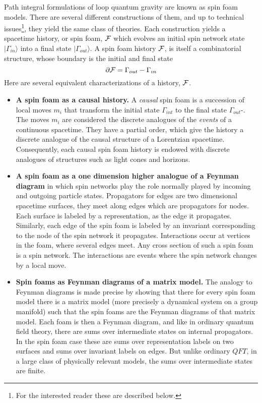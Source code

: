 \documentclass[12pt]{article}
\newcommand{\f}{\begin{equation}}
\newcommand{\ff}{\end{equation}}
\begin{document}
Path integral formulations of loop quantum gravity are known as spin foam models.
There are several different  constructions of them, and up to 
technical issues\footnote{For the interested reader these are described below.},
they yield the same class of theories. Each construction yields a spacetime
history, or spin foam, $\cal F$ which evolves an initial spin network state
$|\Gamma_{in}\rangle $ into   a final state $| \Gamma_{out}\rangle $.  A spin foam
history $\cal F$,  is
itself a combinatorial structure, whose boundary is the initial and final
state
\f
\partial {\cal F} = \Gamma_{out}-\Gamma_{in}
\ff
Here are several equivalent characterizations of a history, $\cal F$.

\begin{itemize}

\item{}{\bf A spin foam as a causal history.}  A {\it causal} spin foam is a succession of
local moves $m_i$ that transform the initial state $\Gamma_{int}$ to
the final state $\Gamma_{out}$\cite{F-foam}-\cite{fmls1}.  The moves $m_i$ are considered the
discrete analogues of the {\it events} of a continuous spacetime. They 
have a partial order,
which give the history a discrete analogue of the causal structure of 
a Lorentzian spacetime.  Consequently, each causal spin foam history
is endowed with discrete analogues of structures such as light cones and horizons.

\item{}{\bf A spin foam as a one dimension higher analogue of a Feynman diagram}
in which spin networks play the role normally played by incoming and 
outgoing particle states\cite{RR-foam}. 
Propagators for edges are two dimensional 
spacetime surfaces, they meet along edges which are propagators for nodes.
Each surface is labeled by a representation, as the edge it propagates. Similarly,
each edge of the spin foam is labeled by an invariant corresponding to the node
of the spin network it propagates. 
Interactions occur at vertices in the foam, where several edges meet.
 Any cross section of such a spin foam is
a spin network.  The interactions are events where the spin network changes by
a local move.  

\item{}{\bf Spin foams as Feynman diagrams of a matrix model.}  The analogy
to Feynman diagrams is made precise by showing that there for every spin foam model
there is a matrix model (more precisely a dynamical system on a group manifold) 
such that the spin foams are the Feynman diagrams of
that matrix model\cite{foam-matrix}.  Each foam is then a Feynman diagram, and like in ordinary
quantum field theory, there are sums over intermediate states on internal
propagators. In the spin foam case these are sums over representation labels
on two surfaces and sums over invariant labels on edges.  But unlike ordinary $QFT$,
in a large class of physically relevant models, the sums over intermediate states are
finite.  


\end{itemize}
\end{document}
